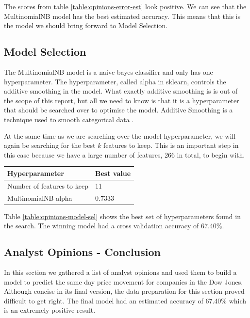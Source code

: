 \documentclass{report}
\begin{document}
The scores from table \ref{table:opinions-error-est} look positive. We can see that the MultinomialNB model has the best estimated accuracy. This means that this is the model we should bring forward to Model Selection.

\subsection{Model Selection}

The MultinomialNB model is a naive bayes classifier and only has one hyperparameter. The hyperparameter, called alpha in sklearn, controls the additive smoothing in the model. What exactly additive smoothing is is out of the scope of this report, but all we need to know is that it is a hyperparameter that should be searched over to optimise the model. Additive Smoothing is a technique used to smooth categorical data \cite{manning2008introduction}.

At the same time as we are searching over the model hyperparameter, we will again be searching for the best $k$ features to keep. This is an important step in this case because we have a large number of features, 266 in total, to begin with.

\begin{center}
  \vspace{8pt}
  \begin{tabular}{l | l}
	  \textbf{Hyperparameter} & \textbf{Best value} \\ \hline
	  Number of features to keep & 11 \\ \hline
	  MultinomialNB alpha & 0.7333
	  \label{table:opinions-model-sel}
  \end{tabular}
\end{center}

Table \ref{table:opinions-model-sel} shows the best set of hyperparameters found in the search. The winning model had a cross validation accuracy of 67.40\%.

\subsection{Analyst Opinions - Conclusion}

In this section we gathered a list of analyst opinions and used them to build a model to predict the same day price movement for companies in the Dow Jones. Although concise in its final version, the data preparation for this section proved difficult to get right. The final model had an estimated accuracy of 67.40\% which is an extremely positive result. 
\end{document}
